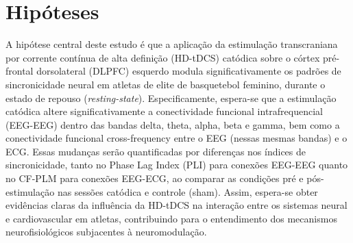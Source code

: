 \chapter{Hipóteses}
\label{chap:hipoteses}

A hipótese central deste estudo é que a aplicação da estimulação transcraniana por corrente contínua de alta definição (HD-tDCS) catódica sobre o córtex pré-frontal dorsolateral (DLPFC) esquerdo modula significativamente os padrões de sincronicidade neural em atletas de elite de basquetebol feminino, durante o estado de repouso (\textit{resting-state}). Especificamente, espera-se que a estimulação catódica altere significativamente a conectividade funcional intrafrequencial (EEG-EEG) dentro das bandas delta, theta, alpha, beta e gamma, bem como a conectividade funcional cross-frequency entre o EEG (nessas mesmas bandas) e o ECG. Essas mudanças serão quantificadas por diferenças nos índices de sincronicidade, tanto no Phase Lag Index (PLI) para conexões EEG-EEG quanto no CF-PLM para conexões EEG-ECG, ao comparar as condições pré e pós-estimulação nas sessões catódica e controle (sham). Assim, espera-se obter evidências claras da influência da HD-tDCS na interação entre os sistemas neural e cardiovascular em atletas, contribuindo para o entendimento dos mecanismos neurofisiológicos subjacentes à neuromodulação.